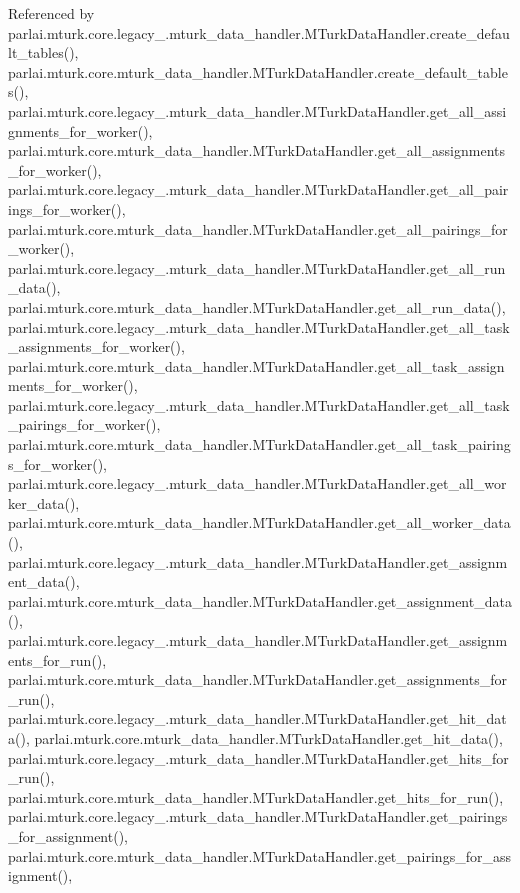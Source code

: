 Referenced by parlai.\+mturk.\+core.\+legacy\+\_.\+mturk\+\_\+data\+\_\+handler.\+M\+Turk\+Data\+Handler.\+create\+\_\+default\+\_\+tables(), parlai.\+mturk.\+core.\+mturk\+\_\+data\+\_\+handler.\+M\+Turk\+Data\+Handler.\+create\+\_\+default\+\_\+tables(), parlai.\+mturk.\+core.\+legacy\+\_.\+mturk\+\_\+data\+\_\+handler.\+M\+Turk\+Data\+Handler.\+get\+\_\+all\+\_\+assignments\+\_\+for\+\_\+worker(), parlai.\+mturk.\+core.\+mturk\+\_\+data\+\_\+handler.\+M\+Turk\+Data\+Handler.\+get\+\_\+all\+\_\+assignments\+\_\+for\+\_\+worker(), parlai.\+mturk.\+core.\+legacy\+\_.\+mturk\+\_\+data\+\_\+handler.\+M\+Turk\+Data\+Handler.\+get\+\_\+all\+\_\+pairings\+\_\+for\+\_\+worker(), parlai.\+mturk.\+core.\+mturk\+\_\+data\+\_\+handler.\+M\+Turk\+Data\+Handler.\+get\+\_\+all\+\_\+pairings\+\_\+for\+\_\+worker(), parlai.\+mturk.\+core.\+legacy\+\_.\+mturk\+\_\+data\+\_\+handler.\+M\+Turk\+Data\+Handler.\+get\+\_\+all\+\_\+run\+\_\+data(), parlai.\+mturk.\+core.\+mturk\+\_\+data\+\_\+handler.\+M\+Turk\+Data\+Handler.\+get\+\_\+all\+\_\+run\+\_\+data(), parlai.\+mturk.\+core.\+legacy\+\_.\+mturk\+\_\+data\+\_\+handler.\+M\+Turk\+Data\+Handler.\+get\+\_\+all\+\_\+task\+\_\+assignments\+\_\+for\+\_\+worker(), parlai.\+mturk.\+core.\+mturk\+\_\+data\+\_\+handler.\+M\+Turk\+Data\+Handler.\+get\+\_\+all\+\_\+task\+\_\+assignments\+\_\+for\+\_\+worker(), parlai.\+mturk.\+core.\+legacy\+\_.\+mturk\+\_\+data\+\_\+handler.\+M\+Turk\+Data\+Handler.\+get\+\_\+all\+\_\+task\+\_\+pairings\+\_\+for\+\_\+worker(), parlai.\+mturk.\+core.\+mturk\+\_\+data\+\_\+handler.\+M\+Turk\+Data\+Handler.\+get\+\_\+all\+\_\+task\+\_\+pairings\+\_\+for\+\_\+worker(), parlai.\+mturk.\+core.\+legacy\+\_.\+mturk\+\_\+data\+\_\+handler.\+M\+Turk\+Data\+Handler.\+get\+\_\+all\+\_\+worker\+\_\+data(), parlai.\+mturk.\+core.\+mturk\+\_\+data\+\_\+handler.\+M\+Turk\+Data\+Handler.\+get\+\_\+all\+\_\+worker\+\_\+data(), parlai.\+mturk.\+core.\+legacy\+\_.\+mturk\+\_\+data\+\_\+handler.\+M\+Turk\+Data\+Handler.\+get\+\_\+assignment\+\_\+data(), parlai.\+mturk.\+core.\+mturk\+\_\+data\+\_\+handler.\+M\+Turk\+Data\+Handler.\+get\+\_\+assignment\+\_\+data(), parlai.\+mturk.\+core.\+legacy\+\_.\+mturk\+\_\+data\+\_\+handler.\+M\+Turk\+Data\+Handler.\+get\+\_\+assignments\+\_\+for\+\_\+run(), parlai.\+mturk.\+core.\+mturk\+\_\+data\+\_\+handler.\+M\+Turk\+Data\+Handler.\+get\+\_\+assignments\+\_\+for\+\_\+run(), parlai.\+mturk.\+core.\+legacy\+\_.\+mturk\+\_\+data\+\_\+handler.\+M\+Turk\+Data\+Handler.\+get\+\_\+hit\+\_\+data(), parlai.\+mturk.\+core.\+mturk\+\_\+data\+\_\+handler.\+M\+Turk\+Data\+Handler.\+get\+\_\+hit\+\_\+data(), parlai.\+mturk.\+core.\+legacy\+\_.\+mturk\+\_\+data\+\_\+handler.\+M\+Turk\+Data\+Handler.\+get\+\_\+hits\+\_\+for\+\_\+run(), parlai.\+mturk.\+core.\+mturk\+\_\+data\+\_\+handler.\+M\+Turk\+Data\+Handler.\+get\+\_\+hits\+\_\+for\+\_\+run(), parlai.\+mturk.\+core.\+legacy\+\_.\+mturk\+\_\+data\+\_\+handler.\+M\+Turk\+Data\+Handler.\+get\+\_\+pairings\+\_\+for\+\_\+assignment(), parlai.\+mturk.\+core.\+mturk\+\_\+data\+\_\+handler.\+M\+Turk\+Data\+Handler.\+get\+\_\+pairings\+\_\+for\+\_\+assignment(), 